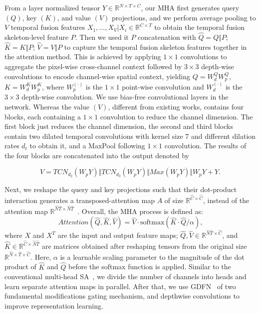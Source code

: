 \documentclass{bmvc2k}
\begin{document}
From a layer normalized tensor $Y \in \mathbb{R}^{N\times T\times C}$, our MHA first generates query $(Q)$, key $(K)$, and value $(V)$ projections, and we perform average pooling to $V$ temporal fusion features ${{X_{1},..., X_{V}|X_{i}\in \mathbb{R}^{C \times T}}}$ to obtain the temporal fusion skeleton-level feature $P$.
Then we used it $P$ concatenation with $\widehat{Q}= Q\Vert P$; $\widehat{K}= K\Vert P$; $\widehat{V}= V\Vert P$ to capture the temporal fusion skeleton features together in the attention method.
This is achieved by applying $1\times 1$ convolutions to aggregate the pixel-wise cross-channel context followed by $3\times 3$ depth-wise convolutions to encode channel-wise spatial context, yielding $Q=W^{Q}_{d}W^{Q}_{p}$, $K=W^{K}_{d}W^{K}_{p}$, where $W^{(\cdot)}_{p}$ is the $1\times 1$ point-wise convolution and $W^{(\cdot)}_{d}$ is the $3\times 3$ depth-wise convolution. We use bias-free convolutional layers in the network. Whereas the value $(V)$, different from existing works, contains four blocks, each containing a $1 \times 1$ convolution to reduce the channel dimension. The first block just reduces the channel dimension, the second and third blocks contain two dilated temporal convolutions with kernel size 7 and different dilation rates $d_{t}$ to obtain it, and a MaxPool following $1 \times 1$ convolution. The results of the four blocks are concatenated into the output denoted by 




\begin{equation}
V= \mathit{TCN}_{d_{2}}(W_{p}Y)\Vert \mathit{TCN}_{d_{3}}(W_{p}Y) \Vert \mathit{Max}(W_{p}Y) \Vert W_{p}Y+Y\text{.}
\end{equation}

Next, we reshape the query and key projections such that their dot-product interaction generates a transposed-attention map $A$ of size $\mathbb{R}^{\widehat{C}\times\widehat{C}}$, instead of the attention map $\mathbb{R}^{\widehat{N}\widehat{T}\times \widehat{N}\widehat{T}}$~\cite{Alexey-17,Ashish-2017}.
Overall, the MHA process is defined as:
\begin{equation}
\mathit{Attention}(\widehat{Q},\widehat{K},\widehat{V})=\widehat{V}\cdot \mathrm{softmax}(\widehat{K}\cdot \widehat{Q}/ \alpha) \text{,}
\end{equation}
where $X$ and $X^{T}$ are the input and output feature maps; $\widehat{Q}, \widehat{V} \in \mathbb{R}^{\widehat{N}\widehat{T} \times \widehat{C} }$, and $\widehat{K}\in \mathbb{R}^{\widehat{C}  \times \widehat{N}\widehat{T}}$ are matrices obtained after reshaping tensors from the original size $\mathbb{R}^{\widehat{N}\times \widehat{T} \times \widehat{C}}$. Here, $\alpha$ is a learnable scaling parameter to the magnitude of the dot product of $\widehat{K}$ and $\widehat{Q}$ before the softmax function is applied.
Similar to the conventional multi-head SA~\cite{Alexey-17}, we divide the number of channels into heads and learn separate attention maps in parallel.
After that, we use GDFN~\cite{Syed-2022} of two fundamental modifications gating mechanism, and depthwise convolutions to improve representation learning.
\end{document}
